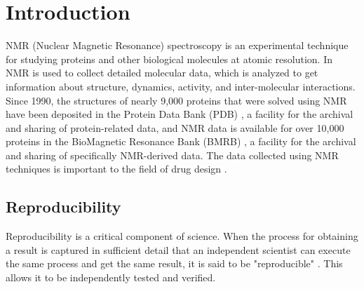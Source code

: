 \chapter{Introduction}

NMR (Nuclear Magnetic Resonance) spectroscopy is an experimental technique for 
studying proteins and other biological molecules at atomic resolution.  In 
NMR is used to collect detailed molecular data, which 
is analyzed to get information about structure, dynamics,  
activity, and inter-molecular interactions.  
Since 1990, the structures of nearly 9,000 
proteins that were solved using NMR have been deposited in the Protein Data 
Bank (PDB) \cite{pdb}, a facility for the archival and sharing of protein-related 
data, and NMR data is available for over 10,000 proteins in the BioMagnetic 
Resonance Bank (BMRB) \cite{bmrb}, a facility for the archival and sharing of 
specifically NMR-derived data.  The data collected using NMR techniques is 
important to the field of drug design 
\cite{stockman2002drugs, moore2003leveraging, reckel2011proteorhodopsin}.



\section{Reproducibility}
Reproducibility is a critical component of science.
When the process for obtaining a result is captured in sufficient detail that
an independent scientist can execute the same process and get the same result,
it is said to be "reproducible" \cite{russell2013reproducibility, nih2014reproducibility}.
This allows it to be independently tested and verified.

